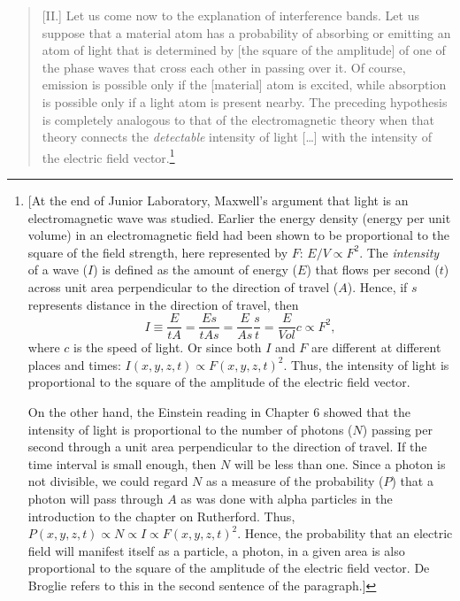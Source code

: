 \begin{quotation}
{[}II.{]} Let us come now to the explanation of interference bands. Let
us suppose that a material atom has a probability of absorbing or
emitting an atom of light that is determined by {[}the square of the
amplitude{]} of one of the phase waves that cross each other in passing
over it. Of course, emission is possible only if the {[}material{]} atom
is excited, while absorption is possible only if a light atom is present
nearby. The preceding hypothesis is completely analogous to that of the
electromagnetic theory when that theory connects the \emph{detectable}
intensity of light [\ldots] with the intensity of the electric field
vector.\footnote{\label{noteDeBroglie}[At the end of Junior Laboratory, Maxwell's argument
  that light is an electromagnetic wave was studied. Earlier the energy
  density (energy per unit volume) in an electromagnetic field had been
  shown to be proportional to the square of the field strength, here
  represented by $F$: $E/V \propto F^2$. The
  \emph{intensity} of a wave ($I$) is defined as the amount of
  energy ($E$) that flows per second ($t$) across unit area
  perpendicular to the direction of travel ($A$). Hence, if
  $s$ represents distance in the direction of travel, then
  \begin{equation*}
  I \equiv \frac{E}{tA} = \frac{Es}{tAs} = \frac{E}{As}\frac{s}{t} =
    \frac{E}{Vol}c \propto F^2 ,
  \end{equation*}
  where $c$ is the speed of light. Or since both $I$ and
  $F$ are different at different places and times:
  $I(x,y,z,t) \propto F(x,y,z,t)^2$. Thus, the
  intensity of light is proportional to the square of the amplitude of
  the electric field vector.

  On the other hand, the Einstein reading in Chapter 6 showed that the
  intensity of light is proportional to the number of photons ($N$)
  passing per second through a unit area perpendicular to the direction
  of travel. If the time interval is small enough, then $N$ will be
  less than one. Since a photon is not divisible, we could regard
  $N$ as a measure of the probability ($P$) that a photon will
  pass through $A$ as was done with alpha particles in the
  introduction to the chapter on Rutherford. Thus, $P(x,y,z,t) \propto N \propto I \propto
  F(x,y,z,t)^2$. Hence, the probability that an
  electric field will manifest itself as a particle, a photon, in a
  given area is also proportional to the square of the amplitude of the
  electric field vector. De Broglie refers to this in the second
  sentence of the paragraph.]}


\end{quotation}
